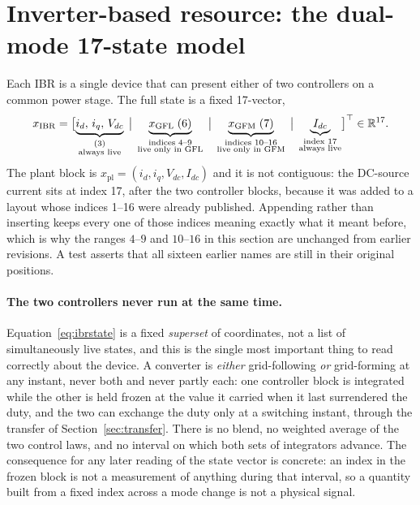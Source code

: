 \documentclass[12pt,a4paper]{article}
\theoremstyle{remark}
\begin{document}
\section{Inverter-based resource: the dual-mode 17-state model}\label{sec:ibr}
Each IBR is a single device that can present either of two controllers on a
common power stage. The full state is a fixed 17-vector,
\begin{equation}
  x_{\mathrm{IBR}}
   =\bigl[\underbrace{i_d,\,i_q,\,V_{dc}}_{\substack{(3)\\
            \text{\scriptsize always live}}}\;\big|\;
          \underbrace{x_{\mathrm{GFL}}\;(6)}_{\substack{\text{indices }4\text{--}9\\
            \text{\scriptsize live only in GFL}}}\;\big|\;
          \underbrace{x_{\mathrm{GFM}}\;(7)}_{\substack{\text{indices }10\text{--}16\\
            \text{\scriptsize live only in GFM}}}\;\big|\;
          \underbrace{I_{dc}}_{\substack{\text{index }17\\
            \text{\scriptsize always live}}}\bigr]^{\top}
   \in\mathbb{R}^{17}.
   \label{eq:ibrstate}
\end{equation}
The plant block is $x_{\mathrm{pl}}=(i_d,i_q,V_{dc},I_{dc})$ and it is not
contiguous: the DC-source current sits at index 17, after the two controller
blocks, because it was added to a layout whose indices 1--16 were already
published. Appending rather than inserting keeps every one of those indices
meaning exactly what it meant before, which is why the ranges $4$--$9$ and
$10$--$16$ in this section are unchanged from earlier revisions. A test asserts
that all sixteen earlier names are still in their original positions.

\paragraph{The two controllers never run at the same time.}
Equation~\eqref{eq:ibrstate} is a fixed \emph{superset} of coordinates, not a
list of simultaneously live states, and this is the single most important thing
to read correctly about the device. A converter is \emph{either} grid-following
\emph{or} grid-forming at any instant, never both and never partly each: one
controller block is integrated while the other is held frozen at the value it
carried when it last surrendered the duty, and the two can exchange the duty
only at a switching instant, through the transfer of
Section~\ref{sec:transfer}. There is no blend, no weighted average of the two
control laws, and no interval on which both sets of integrators advance. The
consequence for any later reading of the state vector is concrete: an index in
the frozen block is not a measurement of anything during that interval, so a
quantity built from a fixed index across a mode change is not a physical
signal.
\end{document}
